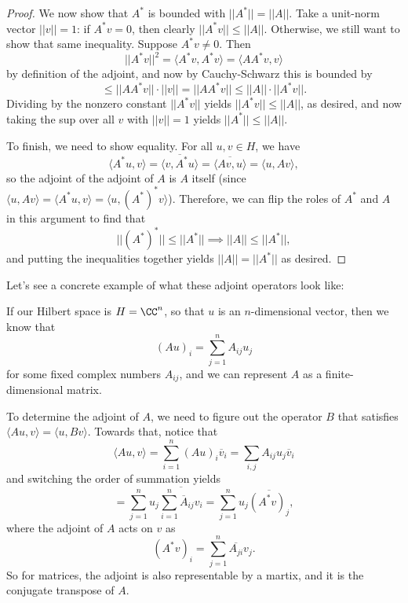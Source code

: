 \begin{proof}
We now show that $A^\ast$ is bounded with $||A^\ast|| = ||A||$. Take a unit-norm vector $||v|| = 1$: if $A^\ast v = 0$, then clearly $||A^\ast v || \le ||A||$. Otherwise, we still want to show that same inequality. Suppose $A^\ast v \ne 0$. Then 
\[
    \boxed{||A^\ast v ||^2} = \langle A^\ast v, A^\ast v \rangle = \langle A A^\ast v, v \rangle
\]
by definition of the adjoint, and now by Cauchy-Schwarz this is bounded by 
\[
    \le ||AA^\ast v || \cdot ||v|| = ||A A^\ast v || \le \boxed{||A|| \cdot ||A^\ast v||}.
\]
Dividing by the nonzero constant $||A^\ast v||$ yields $||A^\ast v|| \le ||A||$, as desired, and now taking the sup over all $v$ with $||v|| = 1$ yields $||A^\ast|| \le ||A||$.

To finish, we need to show equality. For all $u, v \in H$, we have
\[
    \langle A^\ast u, v \rangle = \overline{\langle v, A^\ast u \rangle} = \overline{\langle Av, u \rangle} = \langle u, Av \rangle,
\]
so the adjoint of the adjoint of $A$ is $A$ itself (since $\langle u, Av \rangle = \langle A^\ast u, v \rangle = \langle u, (A^\ast)^\ast v \rangle$). Therefore, we can flip the roles of $A^\ast$ and $A$ in this argument to find that
\[
    ||(A^\ast)^\ast|| \le ||A^\ast|| \implies ||A|| \le ||A^\ast||,
\]
and putting the inequalities together yields $||A|| = ||A^\ast||$ as desired. 
\end{proof}

Let's see a concrete example of what these adjoint operators look like:

\begin{example}
If our Hilbert space is $H = \CC^n$, so that $u$ is an $n$-dimensional vector, then we know that 
\[
    (Au)_i = \sum_{j=1}^n A_{ij} u_j
\]
for some fixed complex numbers $A_{ij}$, and we can represent $A$ as a finite-dimensional matrix.
\end{example}

To determine the adjoint of $A$, we need to figure out the operator $B$ that satisfies $\langle Au, v \rangle = \langle u, Bv \rangle$. Towards that, notice that
\[
    \langle Au, v \rangle  = \sum_{i=1}^n (Au)_i \overline{v}_i = \sum_{i,j} A_{ij} u_j \overline{v}_i 
\]
and switching the order of summation yields 
\[
    = \sum_{j=1}^n u_j \overline{\sum_{i=1}^n \overline{A}_{ij} v_i} = \sum_{j=1}^n u_j \overline{(A^\ast v)_j},
\]
where the adjoint of $A$ acts on $v$ as 
\[
    (A^\ast v)_i = \sum_{j=1}^n \overline{A_{ji}} v_j.
\]
So for matrices, the adjoint is also representable by a martix, and it is the conjugate transpose of $A$.

